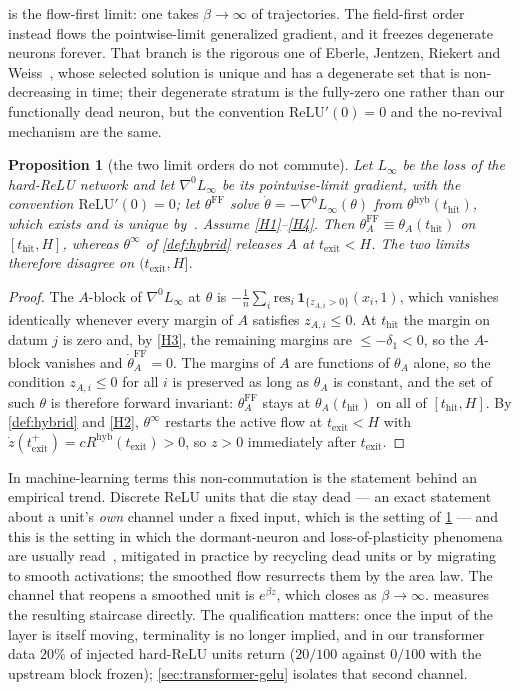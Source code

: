 \documentclass[11pt]{article}
\newtheorem{proposition}[proposition]{Proposition}
\theoremstyle{definition}
\theoremstyle{remark}
\newcommand{\thit}{t_{\mathrm{hit}}}
\newcommand{\texit}{t_{\mathrm{exit}}}
\newcommand{\hyb}{\mathrm{hyb}}
\begin{document}
 is the flow-first limit: one takes $\beta\to\infty$ of
trajectories. The field-first order instead flows the pointwise-limit generalized
gradient, and it freezes degenerate neurons forever. That branch is the rigorous
one of Eberle, Jentzen, Riekert and Weiss~\cite[Theorem 3.3]{EJRW23}, whose
selected solution is unique and has a degenerate set that is non-decreasing in
time; their degenerate stratum is the fully-zero one rather than our functionally
dead neuron, but the convention $\mathrm{ReLU}'(0)=0$ and the no-revival
mechanism are the same.

\begin{proposition}[the two limit orders do not commute]\label{prop:noncomm}
Let $L_\infty$ be the loss of the hard-ReLU network and let $\nabla^0L_\infty$ be
its pointwise-limit gradient, with the convention $\mathrm{ReLU}'(0)=0$; let
$\theta^{\mathrm{FF}}$ solve $\dot\theta=-\nabla^0L_\infty(\theta)$ from
$\theta^{\hyb}(\thit)$, which exists and is unique
by~\cite[Theorem 3.3]{EJRW23}. Assume \eqref{H1}--\eqref{H4}. Then
$\theta_A^{\mathrm{FF}}\equiv\theta_A(\thit)$ on $[\thit,H]$, whereas
$\theta^\infty$ of \cref{def:hybrid} releases $A$ at $\texit<H$. The two limits
therefore disagree on $(\texit,H]$.
\end{proposition}

\begin{proof}
The $A$-block of $\nabla^0L_\infty$ at $\theta$ is
$-\tfrac1n\sum_i\mathrm{res}_i\,\mathbf 1_{\{z_{A,i}>0\}}(x_i,1)$, which vanishes
identically whenever every margin of $A$ satisfies $z_{A,i}\le0$. At $\thit$ the
margin on datum $j$ is zero and, by \eqref{H3}, the remaining margins are
$\le-\delta_1<0$, so the $A$-block vanishes and $\dot\theta_A^{\mathrm{FF}}=0$.
The margins of $A$ are functions of $\theta_A$ alone, so the condition
$z_{A,i}\le0$ for all $i$ is preserved as long as $\theta_A$ is constant, and the
set of such $\theta$ is therefore forward invariant: $\theta_A^{\mathrm{FF}}$
stays at $\theta_A(\thit)$ on all of $[\thit,H]$. By \cref{def:hybrid} and
\eqref{H2}, $\theta^\infty$ restarts the active flow at $\texit<H$ with
$\dot z(\texit^+)=cR^{\hyb}(\texit)>0$, so $z>0$ immediately after $\texit$.
\end{proof}

In machine-learning terms this non-commutation is the statement behind an
empirical trend. Discrete ReLU units that die stay dead --- an exact statement
about a unit's \emph{own} channel under a fixed input, which is the setting of
\cref{prop:noncomm} --- and this is the setting in which the dormant-neuron and
loss-of-plasticity phenomena are usually read~\cite{Sokar23,Lyle23,Dohare24},
mitigated in practice by recycling dead units or by migrating to smooth
activations; the smoothed flow resurrects them by the area law. The channel that
reopens a smoothed unit is $e^{\beta z}$, which closes as $\beta\to\infty$.
 measures the resulting staircase directly. The
qualification matters: once the input of the layer is itself moving, terminality
is no longer implied, and in our transformer data $20\%$ of injected hard-ReLU
units return ($20/100$ against $0/100$ with the upstream block frozen);
\cref{sec:transformer-gelu} isolates that second channel.
\end{document}
